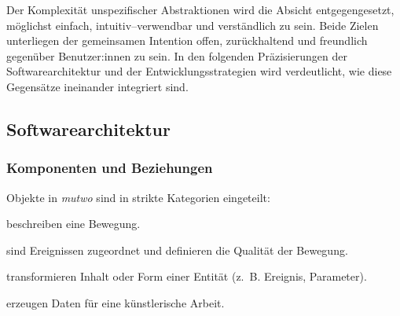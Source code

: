 \documentclass[12pt,a4paper,ngerman]{article}
\begin{document}
Der Komplexität unspezifischer Abstraktionen wird die Absicht entgegengesetzt, möglichst einfach, intuitiv--verwendbar und verständlich zu sein.
Beide Zielen unterliegen der gemeinsamen Intention offen, zurückhaltend und freundlich gegenüber Benutzer:innen zu sein.
In den folgenden Präzisierungen der Softwarearchitektur und der Entwicklungsstrategien wird verdeutlicht, wie diese Gegensätze ineinander integriert sind.








\subsection{Softwarearchitektur}

\subsubsection{Komponenten und Beziehungen}

Objekte in \emph{mutwo} sind in strikte Kategorien eingeteilt:

\bigskip

\hspace{0.5cm}
\begin{minipage}{0.95\textwidth}
    \begin{description}[style=multiline, leftmargin=2.25cm, font=\normalfont\emph]
        \item[Ereignisse] beschreiben eine Bewegung.
        \item[Parameter] sind Ereignissen zugeordnet und definieren die Qualität der Bewegung.
        \item[Übersetzer] transformieren Inhalt oder Form einer Entität (z.~B. Ereignis, Parameter).
        \item[Generatoren] erzeugen Daten für eine künstlerische Arbeit.
    \end{description}
\end{minipage}
\end{document}
